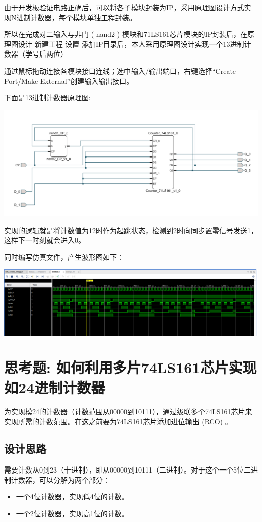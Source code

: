 \documentclass[a4,10pt,zihao=-4]{ctexart}
\begin{document}
由于开发板验证电路正确后，可以将各子模块封装为IP，采用原理图设计方式实现N进制计数器，每个模块单独工程封装。

所以在完成对二输入与非门 ( nand2 ) 模块和71LS161芯片模块的IP封装后，在原理图设计-新建工程-设置-添加IP目录后，本人采用原理图设计实现一个13进制计数器（学号后两位）

通过鼠标拖动连接各模块接口连线；选中输入/输出端口，右键选择“Create Port/Make External”创建输入输出接口。

下面是13进制计数器原理图:

\vspace{1em}
\noindent\includegraphics[width=1\textwidth]{assets/12c.png}

实现的逻辑就是将计数值为12时作为起跳状态，检测到2时向同步置零信号发送1，这样下一时刻就会进入0。

同时编写仿真文件，产生波形图如下：

\vspace{1em}
\noindent\includegraphics[width=1\textwidth]{assets/counter13_sim.png}



\section{思考题: 如何利用多片74LS161芯片实现如24进制计数器}
为实现模24的计数器（计数范围从00000到10111），通过级联多个74LS161芯片来实现所需的计数范围。在这之前要为74LS161芯片添加进位输出 (RCO) 。

\subsection{设计思路}
需要计数从0到23（十进制），即从00000到10111（二进制）。对于这个一个5位二进制计数器，可以分解为两个部分：
\begin{itemize}
  \item 一个4位计数器，实现低4位的计数。
  \item 一个2位计数器，实现高1位的计数。
\end{itemize}
\end{document}
